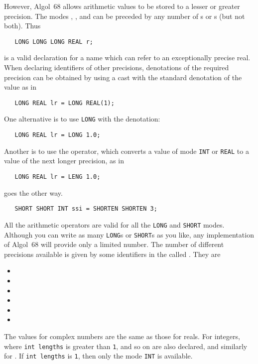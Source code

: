 However, Algol~68 allows arithmetic values to be stored to a lesser
or greater precision.  The modes , ,
 and  can be preceded by any number of
s or s (but not both).  Thus
\begin{verbatim}
   LONG LONG LONG REAL r;
\end{verbatim}
\noindent
is a valid declaration for a name which can refer to an exceptionally
precise real.  When declaring identifiers of other precisions,
denotations of the required precision can be obtained by using a cast
with the standard denotation of the value as in
\begin{verbatim}
   LONG REAL lr = LONG REAL(1);
\end{verbatim}
\noindent
One alternative is to use \verb|LONG| with the denotation:
\begin{verbatim}
   LONG REAL lr = LONG 1.0;
\end{verbatim}
\noindent
Another is to use the  operator, which converts a value of
mode \verb|INT| or \verb|REAL| to a value of the next longer
precision, as in
\begin{verbatim}
   LONG REAL lr = LENG 1.0;
\end{verbatim}
\noindent
{}  goes the other way.
\begin{verbatim}
   SHORT SHORT INT ssi = SHORTEN SHORTEN 3;
\end{verbatim}
\noindent
All the arithmetic operators are valid for all the \verb|LONG| and
\verb|SHORT| modes. Although you can write as many \verb|LONG|s or
\verb|SHORT|s as you like, any implementation of Algol~68 will
provide only a limited number. The number of different precisions
available is given by some identifiers in the 
called . They are
\begin{itemize}
\item {}
\item {}
\item {}
\item {}
\item {}
\item {}
\end{itemize}
The values for complex numbers are the same as those for reals.
For integers, where \verb|int lengths| is
greater than \verb|1|, 
and so on are also declared, and similarly for
.  If
\verb|int lengths| is \verb|1|, then only the mode \verb|INT| is
available.

